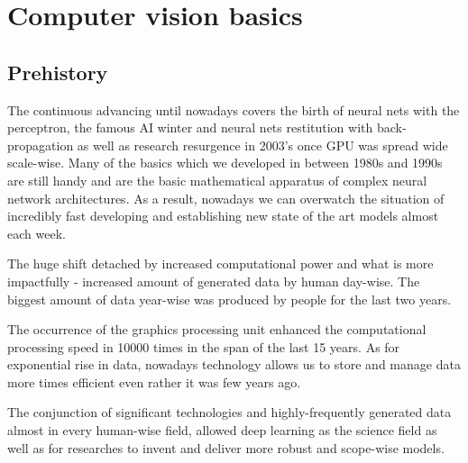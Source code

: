 \chapter{Computer vision basics}
\label{ch:computer_vision_basics}

\section{Prehistory} %
The continuous advancing until nowadays covers the birth of neural nets with the perceptron, the famous AI winter and neural nets restitution with back-propagation as well as research resurgence in 2003's once GPU was spread wide scale-wise. Many of the basics which we developed in between 1980s and 1990s are still handy and are the basic mathematical apparatus of complex neural network architectures. As a result, nowadays we can overwatch the situation of incredibly fast developing and establishing new state of the art models almost each week. 

The huge shift detached by increased computational power and what is more impactfully - increased amount of generated data by human day-wise. The biggest amount of data year-wise was produced by people for the last two years.

The occurrence of the graphics processing unit enhanced the computational processing speed in 10000 times in the span of the last 15 years. As for exponential rise in data, nowadays technology allows us to store and manage data more times efficient even rather it was few years ago. 


The conjunction of significant technologies and highly-frequently generated data almost in every human-wise field, allowed deep learning as the science field as well as for researches to invent and deliver more robust and scope-wise models.

